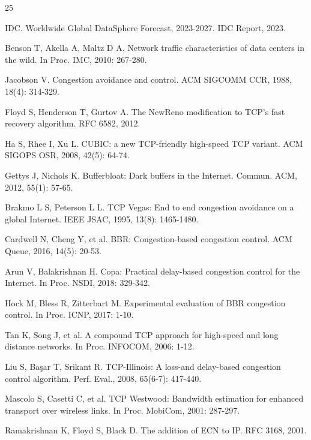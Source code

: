 \documentclass[10pt,twocolumn]{article}
\begin{document}

{\small
\begin{thebibliography}{25}

IDC. Worldwide Global DataSphere Forecast, 2023-2027. IDC Report, 2023.

Benson T, Akella A, Maltz D A. Network traffic characteristics of data centers in the wild. In Proc. IMC, 2010: 267-280.

Jacobson V. Congestion avoidance and control. ACM SIGCOMM CCR, 1988, 18(4): 314-329.

Floyd S, Henderson T, Gurtov A. The NewReno modification to TCP's fast recovery algorithm. RFC 6582, 2012.

Ha S, Rhee I, Xu L. CUBIC: a new TCP-friendly high-speed TCP variant. ACM SIGOPS OSR, 2008, 42(5): 64-74.

Gettys J, Nichols K. Bufferbloat: Dark buffers in the Internet. Commun. ACM, 2012, 55(1): 57-65.

Brakmo L S, Peterson L L. TCP Vegas: End to end congestion avoidance on a global Internet. IEEE JSAC, 1995, 13(8): 1465-1480.

Cardwell N, Cheng Y, et al. BBR: Congestion-based congestion control. ACM Queue, 2016, 14(5): 20-53.

Arun V, Balakrishnan H. Copa: Practical delay-based congestion control for the Internet. In Proc. NSDI, 2018: 329-342.

Hock M, Bless R, Zitterbart M. Experimental evaluation of BBR congestion control. In Proc. ICNP, 2017: 1-10.

Tan K, Song J, et al. A compound TCP approach for high-speed and long distance networks. In Proc. INFOCOM, 2006: 1-12.

Liu S, Ba\c{s}ar T, Srikant R. TCP-Illinois: A loss-and delay-based congestion control algorithm. Perf. Eval., 2008, 65(6-7): 417-440.

Mascolo S, Casetti C, et al. TCP Westwood: Bandwidth estimation for enhanced transport over wireless links. In Proc. MobiCom, 2001: 287-297.

Ramakrishnan K, Floyd S, Black D. The addition of ECN to IP. RFC 3168, 2001.


\end{thebibliography}}
\end{document}
